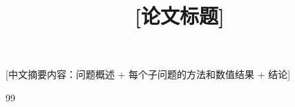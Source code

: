 \documentclass[bwprint]{gmcmthesis}
\title{[论文标题]}
\makeatletter
\renewenvironment{abstract}{%
  \if@twocolumn\section*{\gmcm@cap@abstractname}%
  \else\begin{center}{\zihao{4}\bfseries \gmcm@cap@abstractname\vspace{-.5em}\vspace{\z@}}\end{center}\quotation
  \fi}{\if@twocolumn\else\endquotation\fi}
\makeatother
\begin{document}
\maketitle

\begin{abstract}

[中文摘要内容：问题概述 + 每个子问题的方法和数值结果 + 结论]

\keywords{[关键词1]\quad [关键词2]\quad [关键词3]}
\end{abstract}

\pagestyle{plain}

\newpage
\tableofcontents
\clearpage











\begin{thebibliography}{99}
\end{thebibliography}

\begin{appendices}

\end{appendices}
\end{document}
